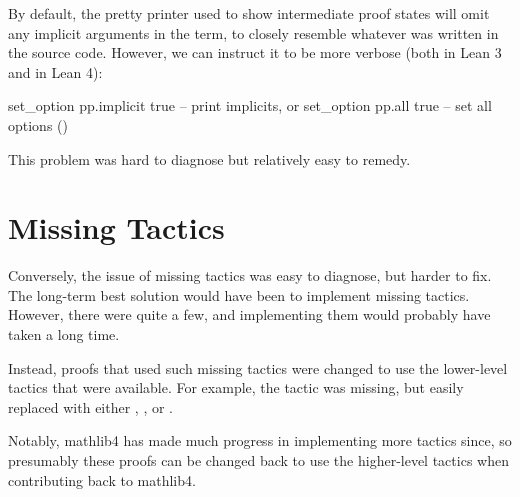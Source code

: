 By default, the pretty printer used to show intermediate proof states will
omit any implicit arguments in the term, to closely resemble whatever was written in the source code.
However, we can instruct it to be more verbose (both in Lean 3 and in Lean 4):
\begin{leancode}
  set_option pp.implicit true -- print implicits, or
  set_option pp.all true      -- set all options ()
\end{leancode}

This problem was hard to diagnose but relatively easy to remedy.


\section{Missing Tactics} 
Conversely, the issue of missing tactics was easy to diagnose, but harder to fix.
The long-term best solution would have been to implement missing tactics.
However, there were quite a few, and implementing them would probably have taken a long time.

Instead, proofs that used such missing tactics were changed to use the lower-level tactics that were
available. For example, the  tactic
was missing, but easily replaced with either , , or .

Notably, mathlib4 has made much progress in implementing more tactics since, 
so presumably these proofs can be changed back to use the higher-level tactics when
contributing back to mathlib4.




